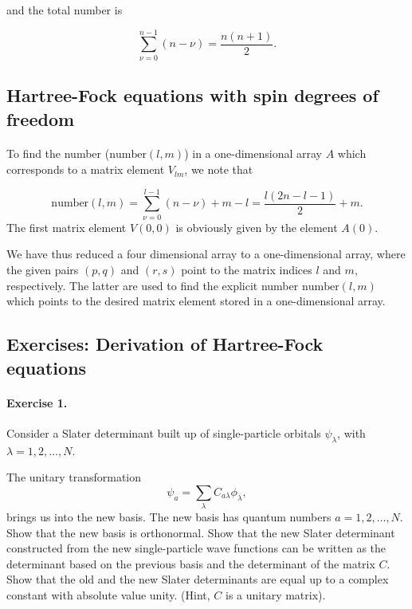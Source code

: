 \documentclass[%
twoside,                 %
final,                   %
10pt]{article}
\begin{document}
\noindent
and the total number is

\begin{equation*}
\sum_{\nu =0}^{n-1}\left(n-\nu\right)=\frac{n(n+1)}{2}.
\end{equation*}



\subsection*{Hartree-Fock equations with spin degrees of freedom}

\paragraph{}

To find the number ($\mathrm{number}(l,m)$) in a one-dimensional array $A$ which corresponds to a matrix element $V_{lm}$, we note that

\begin{equation*}
\mathrm{number}(l,m)=\sum_{\nu =0}^{l-1}\left(n-\nu\right)+m-l=\frac{l(2n-l-1)}{2}+m.
\end{equation*}
The first matrix element $V(0,0)$ is obviously given by the element $A(0)$. 

We have thus reduced a four dimensional array to a one-dimensional array, where the given pairs $(p,q)$ and $(r,s)$ point to the matrix indices $l$
and $m$, respectively. The latter are used to find the explicit number $\mathrm{number}(l,m)$ which points to the desired matrix element stored 
in a one-dimensional array.



\subsection*{Exercises: Derivation of Hartree-Fock equations}

\paragraph{Exercise 1.}
Consider a Slater determinant built up of single-particle orbitals $\psi_{\lambda}$, 
with $\lambda = 1,2,\dots,N$.

The unitary transformation
\[
\psi_a  = \sum_{\lambda} C_{a\lambda}\phi_{\lambda},
\]
brings us into the new basis.  
The new basis has quantum numbers $a=1,2,\dots,N$.
Show that the new basis is orthonormal.
Show that the new Slater determinant constructed from the new single-particle wave functions can be
written as the determinant based on the previous basis and the determinant of the matrix $C$.
Show that the old and the new Slater determinants are equal up to a complex constant with absolute value unity.
(Hint, $C$ is a unitary matrix).
\end{document}
